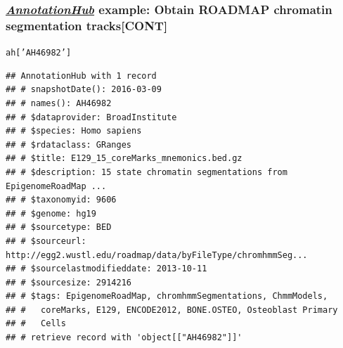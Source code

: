 \documentclass{beamer}\usepackage[]{graphicx}\usepackage[]{color}
\makeatletter
\newcommand{\hlstr}[1]{\textcolor[rgb]{0.192,0.494,0.8}{#1}}%
\newcommand{\hlstd}[1]{\textcolor[rgb]{0.345,0.345,0.345}{#1}}%
\newenvironment{kframe}{%
 \def\at@end@of@kframe{}%
 \ifinner\ifhmode%
  \def\at@end@of@kframe{\end{minipage}}%
  \begin{minipage}{\columnwidth}%
 \fi\fi%
 \def\FrameCommand##1{\hskip\@totalleftmargin \hskip-\fboxsep
 \colorbox{shadecolor}{##1}\hskip-\fboxsep
     \hskip-\linewidth \hskip-\@totalleftmargin \hskip\columnwidth}%
 \MakeFramed {\advance\hsize-\width
   \@totalleftmargin\z@ \linewidth\hsize
   \@setminipage}}%
 {\par\unskip\endMakeFramed%
 \at@end@of@kframe}
\newenvironment{knitrout}{}{} %
\newcommand{\Rpackage}[1]{{\usebeamercolor[fg]{structure} \textsl{#1}}}
\newcommand\Biocpkg[1]{%
  {\href{http://bioconductor.org/packages/release/bioc/html/#1.html}%
    {\Rpackage{#1}}}}
\makeatother
\begin{document}
\begin{frame}[fragile]
  \frametitle{\Biocpkg{AnnotationHub} example: Obtain ROADMAP chromatin segmentation tracks[CONT]}
\begin{knitrout}\tiny
{}\color{fgcolor}\begin{kframe}
\begin{alltt}
\hlstd{ah[}\hlstr{'AH46982'}\hlstd{]}
\end{alltt}
\begin{verbatim}
## AnnotationHub with 1 record
## # snapshotDate(): 2016-03-09 
## # names(): AH46982
## # $dataprovider: BroadInstitute
## # $species: Homo sapiens
## # $rdataclass: GRanges
## # $title: E129_15_coreMarks_mnemonics.bed.gz
## # $description: 15 state chromatin segmentations from EpigenomeRoadMap ...
## # $taxonomyid: 9606
## # $genome: hg19
## # $sourcetype: BED
## # $sourceurl: http://egg2.wustl.edu/roadmap/data/byFileType/chromhmmSeg...
## # $sourcelastmodifieddate: 2013-10-11
## # $sourcesize: 2914216
## # $tags: EpigenomeRoadMap, chromhmmSegmentations, ChmmModels,
## #   coreMarks, E129, ENCODE2012, BONE.OSTEO, Osteoblast Primary
## #   Cells 
## # retrieve record with 'object[["AH46982"]]'
\end{verbatim}
\end{kframe}
\end{knitrout}
\end{frame}
\end{document}
